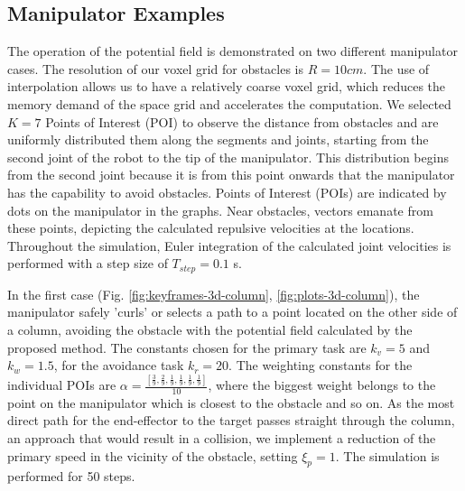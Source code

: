 \documentclass[letterpaper, 10 pt, conference]{ieeeconf}  %
\begin{document}
\subsection{Manipulator Examples}

The operation of the potential field is demonstrated on two different manipulator cases. The resolution of our voxel grid for obstacles is \( R=10cm \). The use of interpolation allows us to have a relatively coarse voxel grid, which reduces the memory demand of the space grid and accelerates the computation. We selected \( K = 7 \) Points of Interest (POI) to observe the distance from obstacles and are uniformly distributed them along the segments and joints, starting from the second joint of the robot to the tip of the manipulator. This distribution begins from the second joint because it is from this point onwards that the manipulator has the capability to avoid obstacles. Points of Interest (POIs) are indicated by dots on the manipulator in the graphs. Near obstacles, vectors emanate from these points, depicting the calculated repulsive velocities at the locations. Throughout the simulation, Euler integration of the calculated joint velocities is performed with a step size of \( T_{step} = 0.1 \) s.

In the first case (Fig. \ref{fig:keyframes-3d-column}, \ref{fig:plots-3d-column}), the manipulator safely 'curls' or selects a path to a point located on the other side of a column, avoiding the obstacle with the potential field calculated by the proposed method. The constants chosen for the primary task are \( k_v = 5 \) and \( k_w = 1.5 \), for the avoidance task \(k_r=20\). The weighting constants for the individual POIs are \( \alpha = \frac{[ \frac{3}{9}, \frac{2}{9}, \frac{1}{9}, \frac{1}{9}, \frac{1}{9}, \frac{1}{9} ]}{10} \), where the biggest weight belongs to the point on the manipulator which is closest to the obstacle and so on. As the most direct path for the end-effector to the target passes straight through the column, an approach that would result in a collision, we implement a reduction of the primary speed in the vicinity of the obstacle, setting \( \xi_{p} = 1 \). The simulation is performed for 50 steps. 
\end{document}
